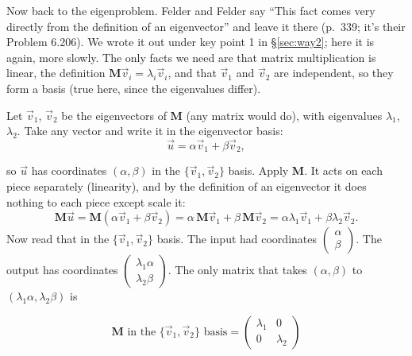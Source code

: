 \documentclass[12pt]{article}
\numberwithin{equation}{section}
\begin{document}
\medskip

\noindent Now back to the eigenproblem. Felder and Felder say ``This fact comes very directly from the definition
of an eigenvector'' and leave it there (p.\ 339; it's their Problem
6.206). We wrote it out under key point 1 in \S\ref{sec:way2}; here it
is again, more slowly. The only facts we need are that matrix
multiplication is linear, the definition $\mathbf{M}\vec{v}_i =
\lambda_i\vec{v}_i$, and that $\vec{v}_1$ and $\vec{v}_2$ are independent,
so they form a basis (true here, since the eigenvalues differ).

Let $\vec{v}_1$, $\vec{v}_2$ be the eigenvectors of $\mathbf{M}$ (any
matrix would do), with eigenvalues $\lambda_1$, $\lambda_2$. Take any vector
and write it in the eigenvector basis:
\begin{equation}
  \vec{u} = \alpha\vec{v}_1 + \beta\vec{v}_2 ,
\end{equation}

\noindent so $\vec{u}$ has coordinates $(\alpha, \beta)$ in the $\{\vec{v}_1, \vec{v}_2\}$
basis. Apply $\mathbf{M}$. It acts on each piece separately (linearity),
and by the definition of an eigenvector it does nothing to each piece
except scale it:
\begin{equation}
  \mathbf{M}\vec{u} = \mathbf{M}(\alpha\vec{v}_1 + \beta\vec{v}_2)
  = \alpha\,\mathbf{M}\vec{v}_1 + \beta\,\mathbf{M}\vec{v}_2
  = \alpha\lambda_1\vec{v}_1 + \beta\lambda_2\vec{v}_2 .
\end{equation}
Now read that in the $\{\vec{v}_1,\vec{v}_2\}$ basis. The input had coordinates
$\left(\begin{smallmatrix} \alpha \\ \beta \end{smallmatrix}\right)$. The output has
coordinates $\left(\begin{smallmatrix} \lambda_1 \alpha \\ \lambda_2 \beta
\end{smallmatrix}\right)$. The only matrix that takes
$(\alpha, \beta)$ to $(\lambda_1 \alpha, \lambda_2 \beta)$ is

\begin{equation}
  \boxed{\;\mathbf{M} \textrm{ in the } \{\vec{v}_1, \vec{v}_2\} \textrm{ basis}
  = \begin{pmatrix} \lambda_1 & 0 \\ 0 & \lambda_2 \end{pmatrix}\;}
\end{equation}
\end{document}
